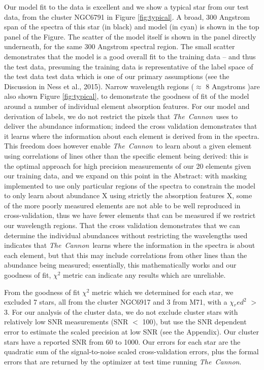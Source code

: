\documentclass[14pt, preprint2]{aastex6}
\newcommand{\project}[1]{\textsl{#1}}
\newcommand{\tc}{\project{The~Cannon}}
\begin{document}
Our model fit to the data is excellent and we show a typical star from our test data, from the cluster NGC6791 in Figure \ref{fig:typical}. A broad, 300 Angstrom span of the spectra of this star (in black) and model (in cyan) is shown in the top panel of the Figure. The scatter of the model itself is shown in the panel directly underneath, for the same 300 Angstrom spectral region. The small scatter demonstrates that the model is a good overall fit to the training data -- and thus the test data, presuming the training data is representative of the label space of the test data test data which is one of our primary assumptions (see the Discussion in Ness et al., 2015). Narrow wavelength regions ($\approx$ 8 Angstroms )are also shown Figure \ref{fig:typical}, to demonstrate the goodness of fit of the model around a number of individual element absorption features. For our model and derivation of labels, we do not restrict the pixels that \tc\ uses to deliver the abundance information; indeed the cross validation demonstrates that it learns where the information about each element is derived from in the spectra. This freedom does however enable \tc\ to learn about a given element using correlations of lines other than the specific element being derived: this is the optimal approach for high precision measurements of our 20 elements given our training data, and we expand on this point in the Abstract: with masking implemented to use only particular regions of the spectra to constrain the model to only learn about abundance X using strictly the absorption features X, some of the more poorly measured elements are not able to be well reproduced in cross-validation, thus we have fewer elements that can be measured if we restrict our wavelength regions. That the cross validation demonstrates that we can determine the individual abundances without restricting the wavelengths used indicates that \tc\ learns where the information in the spectra is about each element, but that this may include correlations from other lines than the abundance being measured; essentially, this mathematically works and our goodness of fit, $\chi^2$ metric can indicate any results which are unreliable. 

From the goodness of fit $\chi^2$ metric which we determined for each star, we excluded 7 stars, all from the cluster NGC6917 and 3 from M71, with a $\chi{_red}^2$ $>$ 3. For our analysis of the cluster data, we do not exclude cluster stars with relatively low SNR measurements (SNR $<$ 100), but use the SNR dependent error to estimate the scaled precision at low SNR (see the Appendix). Our cluster stars have a reported SNR from 60 to 1000. Our errors for each star are the quadratic sum of the signal-to-noise scaled cross-validation errors, plus the formal errors that are returned by the optimizer at test time running \tc. 
\end{document}

